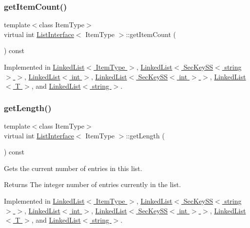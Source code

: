 \subsubsection{\texorpdfstring{get\+Item\+Count()}{getItemCount()}}
{\footnotesize\ttfamily template$<$class Item\+Type$>$ \\
virtual int \hyperlink{classListInterface}{List\+Interface}$<$ Item\+Type $>$\+::get\+Item\+Count (\begin{DoxyParamCaption}{ }\end{DoxyParamCaption}) const\hspace{0.3cm}{\ttfamily [pure virtual]}}



Implemented in \hyperlink{classLinkedList_afc6635f854f48f2f126cf3b60d845220}{Linked\+List$<$ Item\+Type $>$}, \hyperlink{classLinkedList_afc6635f854f48f2f126cf3b60d845220}{Linked\+List$<$ Sec\+Key\+S\+S$<$ string $>$ $>$}, \hyperlink{classLinkedList_afc6635f854f48f2f126cf3b60d845220}{Linked\+List$<$ int $>$}, \hyperlink{classLinkedList_afc6635f854f48f2f126cf3b60d845220}{Linked\+List$<$ Sec\+Key\+S\+S$<$ int $>$ $>$}, \hyperlink{classLinkedList_afc6635f854f48f2f126cf3b60d845220}{Linked\+List$<$ T $>$}, and \hyperlink{classLinkedList_afc6635f854f48f2f126cf3b60d845220}{Linked\+List$<$ string $>$}.

\mbox{\label{classListInterface_afc85695d4137f1e29ff02e179c9f3221}} 
\subsubsection{\texorpdfstring{get\+Length()}{getLength()}}
{\footnotesize\ttfamily template$<$class Item\+Type$>$ \\
virtual int \hyperlink{classListInterface}{List\+Interface}$<$ Item\+Type $>$\+::get\+Length (\begin{DoxyParamCaption}{ }\end{DoxyParamCaption}) const\hspace{0.3cm}{\ttfamily [pure virtual]}}

Gets the current number of entries in this list. \begin{DoxyReturn}{Returns}
The integer number of entries currently in the list. 
\end{DoxyReturn}


Implemented in \hyperlink{classLinkedList_a61d045ef6008b494a1a516ecc992c0e7}{Linked\+List$<$ Item\+Type $>$}, \hyperlink{classLinkedList_a61d045ef6008b494a1a516ecc992c0e7}{Linked\+List$<$ Sec\+Key\+S\+S$<$ string $>$ $>$}, \hyperlink{classLinkedList_a61d045ef6008b494a1a516ecc992c0e7}{Linked\+List$<$ int $>$}, \hyperlink{classLinkedList_a61d045ef6008b494a1a516ecc992c0e7}{Linked\+List$<$ Sec\+Key\+S\+S$<$ int $>$ $>$}, \hyperlink{classLinkedList_a61d045ef6008b494a1a516ecc992c0e7}{Linked\+List$<$ T $>$}, and \hyperlink{classLinkedList_a61d045ef6008b494a1a516ecc992c0e7}{Linked\+List$<$ string $>$}.

